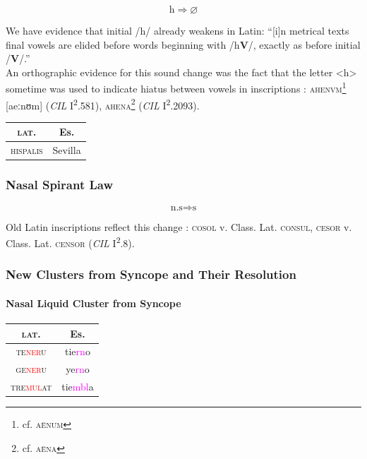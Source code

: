\documentclass{report}[12pt]
\begin{document}
\begin{tcolorbox}
  \[ \text{h} \Rightarrow \varnothing \]
\end{tcolorbox}

We have evidence that initial /h/ already weakens in Latin: ``[i]n metrical texts final vowels are elided before words beginning with /h\textbf{V}/, exactly as before initial /\textbf{V}/.'' \parencite[p.~87]{companion_to_latin} \\
An orthographic evidence for this sound change was the fact that the letter <h> sometime was used to indicate hiatus between vowels in inscriptions \parencite[p.~18]{companion_to_latin}: \textsc{ahenvm}\footnote{cf. \textsc{a\={e}num}} [aeːnʊm] (\emph{CIL} I\textsuperscript{2}.581), \textsc{ahena}\footnote{cf. \textsc{a\={e}na}} (\emph{CIL} I\textsuperscript{2}.2093).

\begin{tabular}{c c}
  \textsc{lat.} & Es. \\
  \hline
  \textsc{hispalis} & Sevilla
\end{tabular}

\subsubsection{Nasal Spirant Law}

\begin{tcolorbox}
  \[ \text{n.s} \Rightarrow \text{s} \]
\end{tcolorbox}

Old Latin inscriptions reflect this change \parencite[p.~17]{companion_to_latin}: \textsc{cosol} v. Class. Lat. \textsc{consul}, \textsc{cesor} v. Class. Lat. \textsc{censor} (\emph{CIL} I\textsuperscript{2}.8).

\subsubsection{New Clusters from Syncope and Their Resolution}

\paragraph*{Nasal Liquid Cluster from Syncope}

\begin{center}
\begin{tabular}{c c}
  \textsc{lat.} & Es. \\
  \hline
  \textsc{te\textcolor{red}{ner}u} & tie\textcolor{magenta}{rn}o \\
  \textsc{ge\textcolor{red}{ner}u} & ye\textcolor{magenta}{rn}o \\
  \textsc{tre\textcolor{red}{mul}at} & tie\textcolor{magenta}{mbl}a \\
\end{tabular}
\end{center}
\end{document}
